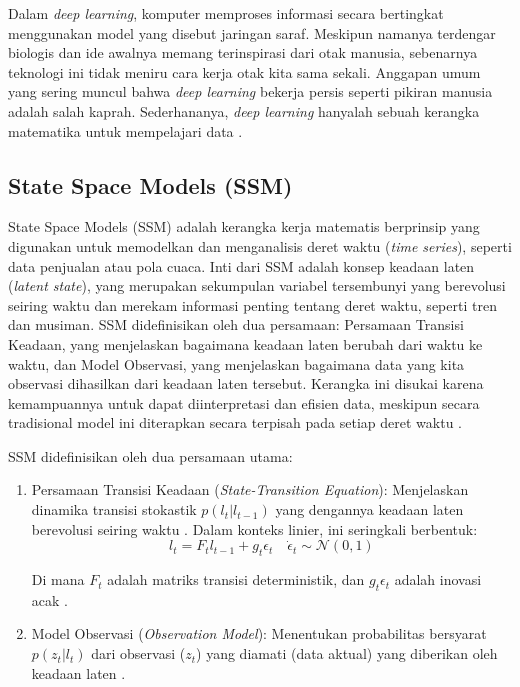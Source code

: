 Dalam \textit{deep learning}, komputer memproses informasi secara bertingkat menggunakan model yang disebut jaringan saraf. Meskipun namanya terdengar biologis dan ide awalnya memang terinspirasi dari otak manusia, sebenarnya teknologi ini tidak meniru cara kerja otak kita sama sekali. Anggapan umum yang sering muncul bahwa \textit{deep learning} bekerja persis seperti pikiran manusia adalah salah kaprah. Sederhananya, \textit{deep learning} hanyalah sebuah kerangka matematika untuk mempelajari data \cite{chollet2021deep}.

\subsection{State Space Models (SSM)} \label{II.Teori1}
State Space Models (SSM) adalah kerangka kerja matematis berprinsip yang digunakan untuk memodelkan dan menganalisis deret waktu (\textit{time series}), seperti data penjualan atau pola cuaca. Inti dari SSM adalah konsep keadaan laten (\textit{latent state}), yang merupakan sekumpulan variabel tersembunyi yang berevolusi seiring waktu dan merekam informasi penting tentang deret waktu, seperti tren dan musiman. SSM didefinisikan oleh dua persamaan: Persamaan Transisi Keadaan, yang menjelaskan bagaimana keadaan laten berubah dari waktu ke waktu, dan Model Observasi, yang menjelaskan bagaimana data yang kita  observasi dihasilkan dari keadaan laten tersebut. Kerangka ini disukai karena kemampuannya untuk dapat diinterpretasi dan efisien data, meskipun secara tradisional model ini diterapkan secara terpisah pada setiap deret waktu \cite{deep_rangapuram_2018}.

SSM didefinisikan oleh dua persamaan utama:
\begin{enumerate}
    \item Persamaan Transisi Keadaan (\textit{State-Transition Equation}): Menjelaskan dinamika transisi stokastik $p(l_t|l_{t-1})$ yang dengannya keadaan laten berevolusi seiring waktu \cite{deep_rangapuram_2018}. Dalam konteks linier, ini seringkali berbentuk:
	\\[5pt]
    \begin{equation}
        l_{t}=F_{t}l_{t-1}+g_{t}\epsilon_{t} \quad \dot{\epsilon}_{t}\sim\mathcal{N}(0,1) \label{eq:ssm-transition}
    \end{equation}
    \vspace{1em}

    Di mana $F_{t}$ adalah matriks transisi deterministik, dan $g_{t}\epsilon_{t}$ adalah inovasi acak \cite{deep_rangapuram_2018}.

    \item Model Observasi (\textit{Observation Model}): Menentukan probabilitas bersyarat $p(z_t|l_t)$ dari observasi ($z_t$) yang diamati (data aktual) yang diberikan oleh keadaan laten \cite{deep_rangapuram_2018}.
\end{enumerate}

